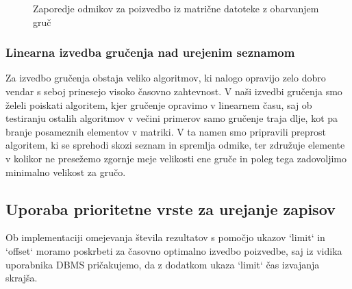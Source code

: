\documentclass[a4paper,12pt,openright]{book}
\begin{document}
\hfill \break
\begin{figure}[H]
\begin{center}
\caption{Zaporedje odmikov za poizvedbo iz matrične datoteke z obarvanjem gruč}
\end{center}
\end{figure}
        
        \subsubsection{Linearna izvedba gručenja nad urejenim seznamom}
        Za izvedbo gručenja obstaja veliko algoritmov, ki nalogo opravijo zelo dobro vendar s seboj prinesejo visoko časovno zahtevnost. V naši izvedbi gručenja smo želeli poiskati algoritem, kjer gručenje opravimo v linearnem času, saj ob testiranju ostalih algoritmov v večini primerov samo gručenje traja dlje, kot pa branje posameznih elementov v matriki. V ta namen smo pripravili preprost algoritem, ki se sprehodi skozi seznam in spremlja odmike, ter združuje elemente v kolikor ne presežemo zgornje meje velikosti ene gruče in poleg tega zadovoljimo minimalno velikost za gručo.
        
        \subsection{Uporaba prioritetne vrste za urejanje zapisov}

        Ob implementaciji omejevanja števila rezultatov s pomočjo ukazov `limit` in `offset` moramo poskrbeti za časovno optimalno izvedbo poizvedbe, saj iz vidika uporabnika DBMS pričakujemo, da z dodatkom ukaza `limit` čas izvajanja skrajša.
\end{document}
